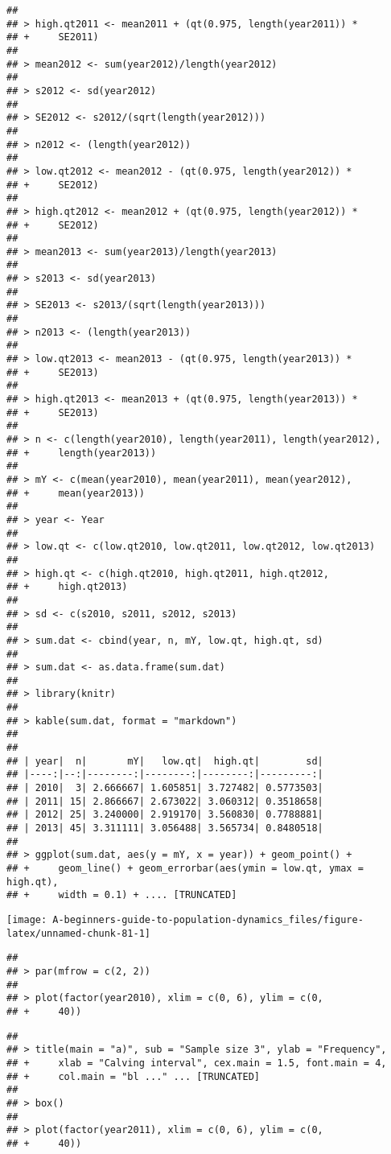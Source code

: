 \documentclass[]{book}
\begin{document}
\begin{verbatim}
## 
## > high.qt2011 <- mean2011 + (qt(0.975, length(year2011)) * 
## +     SE2011)
## 
## > mean2012 <- sum(year2012)/length(year2012)
## 
## > s2012 <- sd(year2012)
## 
## > SE2012 <- s2012/(sqrt(length(year2012)))
## 
## > n2012 <- (length(year2012))
## 
## > low.qt2012 <- mean2012 - (qt(0.975, length(year2012)) * 
## +     SE2012)
## 
## > high.qt2012 <- mean2012 + (qt(0.975, length(year2012)) * 
## +     SE2012)
## 
## > mean2013 <- sum(year2013)/length(year2013)
## 
## > s2013 <- sd(year2013)
## 
## > SE2013 <- s2013/(sqrt(length(year2013)))
## 
## > n2013 <- (length(year2013))
## 
## > low.qt2013 <- mean2013 - (qt(0.975, length(year2013)) * 
## +     SE2013)
## 
## > high.qt2013 <- mean2013 + (qt(0.975, length(year2013)) * 
## +     SE2013)
## 
## > n <- c(length(year2010), length(year2011), length(year2012), 
## +     length(year2013))
## 
## > mY <- c(mean(year2010), mean(year2011), mean(year2012), 
## +     mean(year2013))
## 
## > year <- Year
## 
## > low.qt <- c(low.qt2010, low.qt2011, low.qt2012, low.qt2013)
## 
## > high.qt <- c(high.qt2010, high.qt2011, high.qt2012, 
## +     high.qt2013)
## 
## > sd <- c(s2010, s2011, s2012, s2013)
## 
## > sum.dat <- cbind(year, n, mY, low.qt, high.qt, sd)
## 
## > sum.dat <- as.data.frame(sum.dat)
## 
## > library(knitr)
## 
## > kable(sum.dat, format = "markdown")
## 
## 
## | year|  n|       mY|   low.qt|  high.qt|        sd|
## |----:|--:|--------:|--------:|--------:|---------:|
## | 2010|  3| 2.666667| 1.605851| 3.727482| 0.5773503|
## | 2011| 15| 2.866667| 2.673022| 3.060312| 0.3518658|
## | 2012| 25| 3.240000| 2.919170| 3.560830| 0.7788881|
## | 2013| 45| 3.311111| 3.056488| 3.565734| 0.8480518|
## 
## > ggplot(sum.dat, aes(y = mY, x = year)) + geom_point() + 
## +     geom_line() + geom_errorbar(aes(ymin = low.qt, ymax = high.qt), 
## +     width = 0.1) + .... [TRUNCATED]
\end{verbatim}

\begin{center}\texttt{[image: A-beginners-guide-to-population-dynamics\_files/figure-latex/unnamed-chunk-81-1]} \end{center}

\begin{verbatim}
## 
## > par(mfrow = c(2, 2))
## 
## > plot(factor(year2010), xlim = c(0, 6), ylim = c(0, 
## +     40))
\end{verbatim}

\begin{verbatim}
## 
## > title(main = "a)", sub = "Sample size 3", ylab = "Frequency", 
## +     xlab = "Calving interval", cex.main = 1.5, font.main = 4, 
## +     col.main = "bl ..." ... [TRUNCATED] 
## 
## > box()
## 
## > plot(factor(year2011), xlim = c(0, 6), ylim = c(0, 
## +     40))
\end{verbatim}
\end{document}
